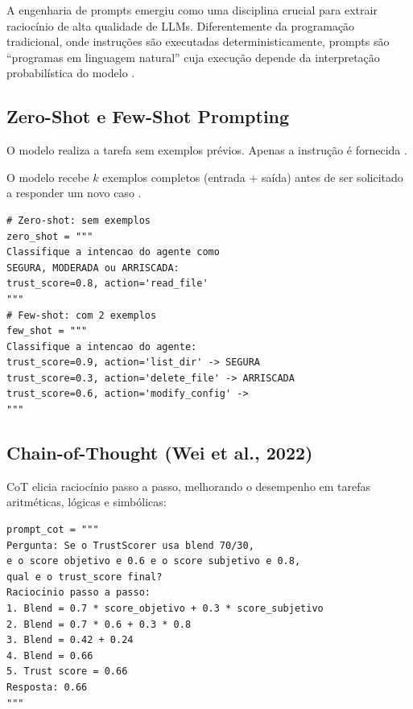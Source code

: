 A engenharia de prompts emergiu como uma disciplina crucial para extrair
raciocínio de alta qualidade de LLMs. Diferentemente da programação
tradicional, onde instruções são executadas deterministicamente, prompts
são ``programas em linguagem natural'' cuja execução depende da
interpretação probabilística do modelo \cite{white2023prompt}.
\subsection{Zero-Shot e Few-Shot Prompting}
\begin{definicao}
O modelo realiza a tarefa sem exemplos prévios. Apenas a instrução é
fornecida \cite{brown2020language}.
\end{definicao}
\begin{definicao}
O modelo recebe $k$ exemplos completos (entrada + saída) antes de ser
solicitado a responder um novo caso \cite{brown2020language}.
\end{definicao}
\begin{lstlisting}[style=pythonstyle]
# Zero-shot: sem exemplos
zero_shot = """
Classifique a intencao do agente como
SEGURA, MODERADA ou ARRISCADA:
trust_score=0.8, action='read_file'
"""
# Few-shot: com 2 exemplos
few_shot = """
Classifique a intencao do agente:
trust_score=0.9, action='list_dir' -> SEGURA
trust_score=0.3, action='delete_file' -> ARRISCADA
trust_score=0.6, action='modify_config' ->
"""
\end{lstlisting}
\subsection{Chain-of-Thought (Wei et al., 2022)}
CoT \cite{wei2022chain} elicia raciocínio passo a passo, melhorando o
desempenho em tarefas aritméticas, lógicas e simbólicas:
\begin{lstlisting}[style=pythonstyle]
prompt_cot = """
Pergunta: Se o TrustScorer usa blend 70/30,
e o score objetivo e 0.6 e o score subjetivo e 0.8,
qual e o trust_score final?
Raciocinio passo a passo:
1. Blend = 0.7 * score_objetivo + 0.3 * score_subjetivo
2. Blend = 0.7 * 0.6 + 0.3 * 0.8
3. Blend = 0.42 + 0.24
4. Blend = 0.66
5. Trust score = 0.66
Resposta: 0.66
"""
\end{lstlisting}

